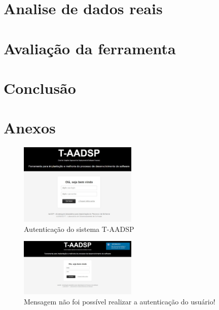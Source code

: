 \documentclass{acm_proc_article-sp}
\begin{document}
\section{Analise de dados reais}

\section{Avaliação da ferramenta}


\section{Conclusão}






\section{Anexos}

\begin{figure}[h]
\centering %
\includegraphics[width=0.5\textwidth]{RF_autenticacao.jpg} %
\caption{Autenticação do sistema T-AADSP}
\end{figure}

\begin{figure}[h]
\centering %
\includegraphics[width=0.5\textwidth]{RF_autenticacao_dados_incorretos.jpg} %
\caption{Mensagem não foi possível realizar a autenticação do usuário! }
\end{figure}
\end{document}
